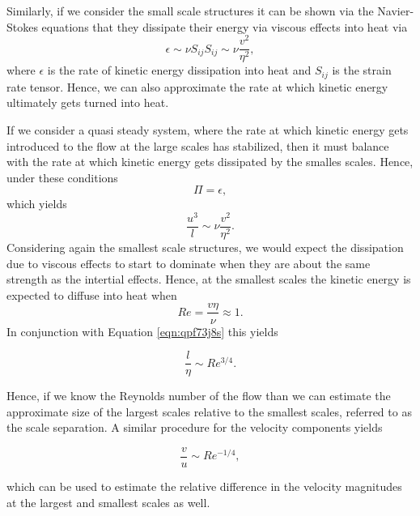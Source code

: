 Similarly, if we consider the small scale structures it can be shown via the Navier-Stokes equations that they dissipate their energy via viscous effects into heat via
\begin{equation}
	\epsilon \sim \nu S_{ij} S_{ij} \sim \nu \frac{v^2}{\eta^2},
\end{equation}
where $\epsilon$ is the rate of kinetic energy dissipation into heat and $S_{ij}$ is the strain rate tensor. Hence, we can also approximate the rate at which kinetic energy ultimately gets turned into heat.

If we consider a quasi steady system, where the rate at which kinetic energy gets introduced to the flow at the large scales has stabilized, then it must balance with the rate at which kinetic energy gets dissipated by the smalles scales. Hence, under these conditions
\begin{equation}
	\Pi = \epsilon,
\end{equation}
which yields
\begin{equation}
	\label{eqn:qpf73j8s}
	\frac{u^3}{l} \sim \nu \frac{v^2}{\eta^2}.
\end{equation}
Considering again the smallest scale structures, we would expect the dissipation due to viscous effects to start to dominate when they are about the same strength as the intertial effects. Hence, at the smallest scales the kinetic energy is expected to diffuse into heat when
\begin{equation}
	Re = \frac{v \eta}{\nu} \approx 1.
\end{equation}
In conjunction with Equation \ref{eqn:qpf73j8s} this yields
\begin{eqBox}
\begin{equation}
	\frac{l}{\eta} \sim Re^{3/4}.
\end{equation}
\end{eqBox}
Hence, if we know the Reynolds number of the flow than we can estimate the approximate size of the largest scales relative to the smallest scales, referred to as the scale separation. A similar procedure for the velocity components yields
\begin{eqBox}
\begin{equation}
	\frac{v}{u} \sim Re^{-1/4},
\end{equation}
\end{eqBox}
which can be used to estimate the relative difference in the velocity magnitudes at the largest and smallest scales as well.

